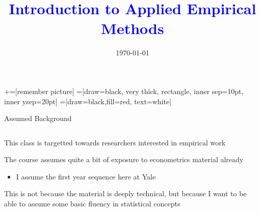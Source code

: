 \documentclass[notes,11pt, aspectratio=169]{beamer}
\title[]{\textcolor{blue}{Introduction to Applied Empirical Methods}}
\author[PGP]{}
\institute[FRBNY]{\small{Paul Goldsmith-Pinkham}}
\date{\today}
\newenvironment{wideitemize}{\itemize\addtolength{\itemsep}{10pt}}{\enditemize}
\begin{document}
\newcommand\marktopleft[1]{%
    \tikz[overlay,remember picture] 
        \node (marker-#1-a) at (-.3em,.3em) {};%
}
\newcommand\markbottomright[2]{%
    \tikz[overlay,remember picture] 
        \node (marker-#1-b) at (0em,0em) {};%
}
+=[remember picture] 
 =[draw=black, very thick, rectangle, inner sep=10pt, inner ysep=20pt]
 =[draw=black,fill=red, text=white]

\begin{frame}
\maketitle

\end{frame}

\begin{frame}{Assumed Background}
\begin{columns}[T] %
\begin{column}{.7\textwidth}
  \begin{wideitemize}
  \item This class is targetted towards researchers interested in empirical work
  \item The course assumes quite a bit of exposure to econometrics material already
    \begin{itemize}
    \item I assume the first year sequence here at Yale
    \end{itemize}
  \item This is not because the material is deeply technical, but
    because I want to be able to assume some basic fluency in
    statistical concepts
  \end{wideitemize}
\end{column}%
\hfill%
\begin{column}{.38\textwidth}
  \makebox[\linewidth][c]{
    \resizebox{\linewidth}{!}{
    }
  }
\end{column}%
\end{columns}
\end{frame}
\end{document}
